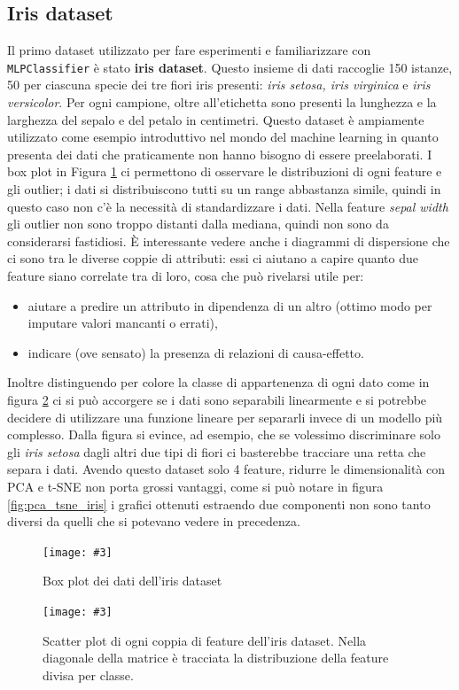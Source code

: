 \documentclass[12pt, twoside, letterpaper]{report}
\newcommand{\img}[4] {
	\begin{figure}
		\centering
		\texttt{[image: \#3]}\\
		\caption{#1}
		\label{fig:#4}
	\end{figure}
}
\begin{document}
		\subsection{Iris dataset}
			Il primo dataset utilizzato per fare esperimenti e familiarizzare con \texttt{MLPClassifier} è stato \textbf{iris dataset}. Questo insieme di dati raccoglie 150 istanze, 50 per ciascuna specie dei tre fiori iris presenti: \textit{iris setosa, iris virginica} e \textit{iris versicolor}. Per ogni campione, oltre all'etichetta sono presenti la lunghezza e la larghezza del sepalo e del petalo in centimetri. Questo dataset è ampiamente utilizzato come esempio introduttivo nel mondo del machine learning in quanto presenta dei dati che praticamente non hanno bisogno di essere preelaborati. I box plot in Figura \ref{fig:boxplot_iris} ci permettono di osservare le distribuzioni di ogni feature e gli outlier; i dati si distribuiscono tutti su un range abbastanza simile, quindi in questo caso non c'è la necessità di standardizzare i dati. Nella feature \textit{sepal width} gli outlier non sono troppo distanti dalla mediana, quindi non sono da considerarsi fastidiosi. È interessante vedere anche i diagrammi di dispersione che ci sono tra le diverse coppie di attributi: essi ci aiutano a capire quanto due feature siano correlate tra di loro, cosa che può rivelarsi utile per:
			\begin{itemize}
				\item aiutare a predire un attributo in dipendenza di un altro (ottimo modo per imputare valori mancanti o errati),
				\item indicare (ove sensato) la presenza di relazioni di causa-effetto.
			\end{itemize}
			Inoltre distinguendo per colore la classe di appartenenza di ogni dato come in figura \ref{fig:scatter_iris}  ci si può accorgere se i dati sono separabili linearmente e si potrebbe decidere di utilizzare una funzione lineare per separarli invece di un modello più complesso. Dalla figura si evince, ad esempio, che se volessimo discriminare solo gli \textit{iris setosa} dagli altri due tipi di fiori ci basterebbe tracciare una retta che separa i dati. Avendo questo dataset solo 4 feature, ridurre le dimensionalità con PCA e t-SNE non porta grossi vantaggi, come si può notare in figura \ref{fig:pca_tsne_iris} i grafici ottenuti estraendo due componenti non sono tanto diversi da quelli che si potevano vedere in precedenza.
			
			\img{Box plot dei dati dell'iris dataset}{0.5}{boxplot.png}{boxplot_iris}
			\img{Scatter plot di ogni coppia di feature dell'iris dataset. Nella diagonale della matrice è tracciata la distribuzione della feature divisa per classe.}{0.6}{scatter.png}{scatter_iris}
			
\end{document}
